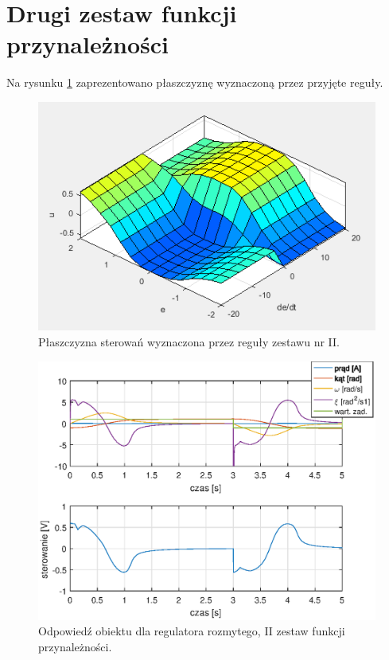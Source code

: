 \FloatBarrier
\section{Drugi zestaw funkcji przynależności}

Na rysunku \ref{set2_surface} zaprezentowano płaszczyznę wyznaczoną przez przyjęte reguły.
\begin{figure}[h!]
	\centering
	\includegraphics[scale = 0.8]{fig/fuzzySurface.PNG}
	\caption		
	{Płaszczyzna sterowań wyznaczona przez reguły zestawu nr II.}
	\label{set2_surface}
\end{figure}

\begin{figure}[h!]
	\centering
	\includegraphics[scale = 0.8]{fig/fuzzy_odp2.eps}
	\caption		
	{Odpowied\'z obiektu dla regulatora rozmytego, II zestaw funkcji przynależności.}
	\label{fuzzyOdp2}
\end{figure}

